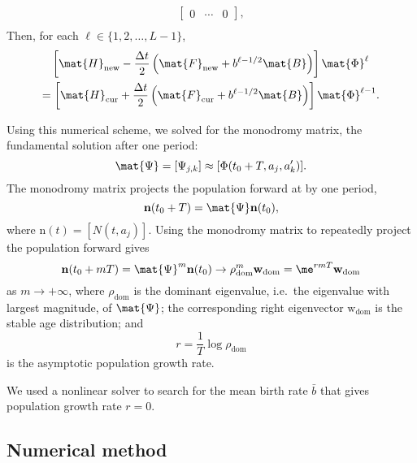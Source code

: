 \documentclass{jpmarticle}
\renewcommand{\vec}[1]{\boldsymbol{\mathrm{#1}}}
\let\subequationsorig\subequations%
\let\endsubequationsorig\endsubequations%
\renewenvironment{subequations}{
  \subequationsorig
  \renewcommand{\theequation}{\theparentequation.\arabic{equation}}
}{
  \endsubequationsorig
}
\begin{document}
\begin{subequations}
\begin{align}
\begin{bmatrix}
      0 & \cdots & 0
    \end{bmatrix},
    \\
  \end{align}
  Then, for each $\ell \in \{1, 2, \ldots, L - 1\}$,
  \begin{multline}
    \left[
      \mat{H}_{\mathrm{new}}
      - \frac{\Delta t}{2}
      \left(
        \mat{F}_{\mathrm{new}}
        + b^{\ell - 1 / 2} \mat{B}
      \right)
    \right]
    \mat{\Phi}^{\ell}
    \\
    =
    \left[
      \mat{H}_{\mathrm{cur}}
      + \frac{\Delta t}{2}
      \left(
        \mat{F}_{\mathrm{cur}}
        + b^{\ell - 1 / 2} \mat{B}
      \right)
    \right]
    \mat{\Phi}^{\ell - 1}.
  \end{multline}
\end{subequations}

Using this numerical scheme, we solved for the monodromy matrix, the
fundamental solution after one period:
\begin{equation}
  \mat{\Psi} = [\Psi_{j, k}] \approx [\Phi(t_0 + T, a_j, a'_k)].
\end{equation}
The monodromy matrix projects the population forward at by one period,
\begin{equation}
  \vec{n}(t_0 + T) = \mat{\Psi} \vec{n}(t_0),
\end{equation}
where $\vec{n}(t) = [N(t, a_j)]$.
Using the monodromy matrix to repeatedly project the population
forward gives
\begin{equation}
  \vec{n}(t_0 + m T)
  = \mat{\Psi}^m \vec{n}(t_0)
  \to \rho_{\mathrm{dom}}^m \vec{w}_{\mathrm{dom}}
  = \me^{r m T} \vec{w}_{\mathrm{dom}}
\end{equation}
as $m \to +\infty$, where $\rho_{\mathrm{dom}}$ is the dominant eigenvalue,
i.e.~the eigenvalue with largest magnitude, of $\mat{\Psi}$;
the corresponding right eigenvector $\vec{w}_{\mathrm{dom}}$ is the
stable age distribution; and
\begin{equation}
  r = \frac{1}{T} \log \rho_{\mathrm{dom}}
\end{equation}
is the asymptotic population growth rate.

We used a nonlinear solver to search for the mean birth rate $\bar{b}$
that gives population growth rate $r = 0$.


\subsection{Numerical method}
\end{document}
